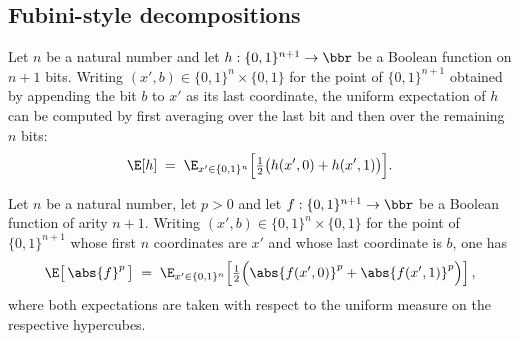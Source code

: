 \subsection{Fubini-style decompositions}

\begin{lemma}
\label{BooleanAnalysis.Hypercontractivity.expect_succ_eq_iterated}
\leanok
{}
Let $n$ be a natural number and let $h : \{0,1\}^{n+1} \to \bbr$ be a Boolean function on $n+1$ bits. Writing $(x', b)
\in \{0,1\}^n \times \{0,1\}$ for the point of $\{0,1\}^{n+1}$ obtained by appending the
bit $b$ to $x'$ as its last coordinate, the uniform expectation of $h$ can be computed
by first averaging over the last bit and then over the remaining $n$ bits:
\[
  \E[h] \;=\; \E_{x' \in \{0,1\}^n}\Bigl[\tfrac12\bigl(h(x', 0) + h(x', 1)\bigr)\Bigr].
\]
\end{lemma}

\begin{lemma}
\label{BooleanAnalysis.Hypercontractivity.norm_collapse_rpow}
\leanok
{}
Let $n$ be a natural number, let $p > 0$ and let $f : \{0,1\}^{n+1} \to \bbr$ be a Boolean function of arity $n+1$.
Writing $(x', b) \in \{0,1\}^n \times \{0,1\}$ for the point of $\{0,1\}^{n+1}$ whose
first $n$ coordinates are $x'$ and whose last coordinate is $b$, one has
\[
  \E\bigl[\,\abs{f}^p\,\bigr]
  \;=\;
\E_{x' \in \{0,1\}^n}\!\left[\tfrac12\Bigl(\abs{f(x', 0)}^p + \abs{f(x',
1)}^p\Bigr)\right],
\]
where both expectations are taken with respect to the uniform measure on the respective
hypercubes.
\end{lemma}

